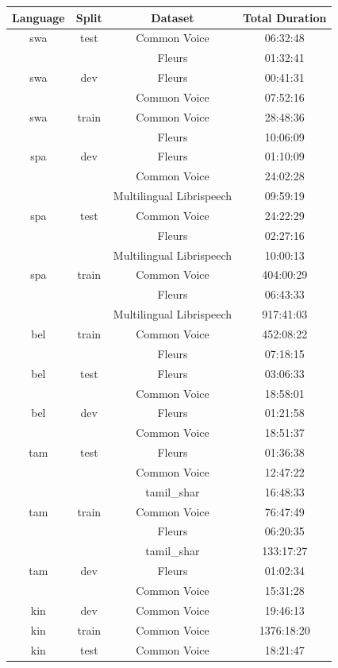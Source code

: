 
\begin{longtable}{cccc}
\toprule
Language & Split & Dataset & Total Duration \\ 
\midrule
swa & test & Common Voice & 06:32:48 \\ 
 & & Fleurs & 01:32:41 \\ 
swa & dev & Fleurs & 00:41:31 \\ 
 & & Common Voice & 07:52:16 \\ 
swa & train & Common Voice & 28:48:36 \\ 
 & & Fleurs & 10:06:09 \\ \midrule
spa & dev & Fleurs & 01:10:09 \\ 
 & & Common Voice & 24:02:28 \\ 
 & & Multilingual Librispeech  & 09:59:19 \\ 
spa & test & Common Voice & 24:22:29 \\ 
 & & Fleurs & 02:27:16 \\ 
 & & Multilingual Librispeech & 10:00:13 \\ 
spa & train & Common Voice & 404:00:29 \\ 
 & & Fleurs & 06:43:33 \\ 
 & & Multilingual Librispeech & 917:41:03 \\ \midrule
bel & train & Common Voice & 452:08:22 \\ 
 & & Fleurs & 07:18:15 \\ 
bel & test & Fleurs & 03:06:33 \\ 
 & & Common Voice & 18:58:01 \\ 
bel & dev & Fleurs & 01:21:58 \\ 
 & & Common Voice & 18:51:37 \\ \midrule
tam & test & Fleurs & 01:36:38 \\ 
 & & Common Voice & 12:47:22 \\ 
 & & tamil_shar & 16:48:33 \\ 
tam & train & Common Voice & 76:47:49 \\ 
 & & Fleurs & 06:20:35 \\ 
 & & tamil_shar & 133:17:27 \\ 
tam & dev & Fleurs & 01:02:34 \\ 
 & & Common Voice & 15:31:28 \\ \midrule
kin & dev & Common Voice & 19:46:13 \\ 
kin & train & Common Voice & 1376:18:20 \\ 
kin & test & Common Voice & 18:21:47 \\ \midrule

\end{longtable}
